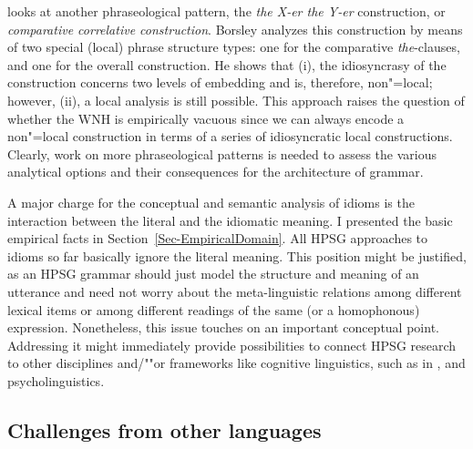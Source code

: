 \documentclass[output=paper
	        ,collection
	        ,collectionchapter
 	        ,biblatex
                ,babelshorthands
                ,newtxmath
                ,draftmode
                ,colorlinks, citecolor=brown
]{langscibook}
\begin{document}
\citet{Borsley2004a} looks at another phraseological pattern, the \emph{the X-er the Y-er} construction, or \emph{comparative correlative construction}.
Borsley analyzes this construction by means of two special (local) phrase structure types: one for the comparative \emph{the}-clauses, and one for the overall construction. He shows that (i), the idiosyncrasy of the construction concerns two levels of embedding and is, therefore, non"=local; however, (ii),
a local analysis is still possible. This approach raises the question of whether the WNH is empirically vacuous since we can always encode a non"=local construction in terms of a series of idiosyncratic local constructions. 
Clearly, work on more phraseological patterns is needed to assess the various analytical options and their consequences for the architecture of grammar.


A major charge for the conceptual and semantic analysis of idioms is the interaction between the literal and the idiomatic meaning. 
I presented the basic empirical facts in Section~\ref{Sec-EmpiricalDomain}. 
All HPSG approaches to idioms so far basically ignore the literal meaning.
This position might be justified, as  an HPSG grammar should just model the structure and meaning of an utterance and need not worry about the meta-linguistic relations among different lexical items or among different readings of the same (or a homophonous) expression.
Nonetheless, this issue touches on an important conceptual point. 
Addressing it might immediately provide possibilities to connect HPSG research to other disciplines and/""or frameworks like cognitive linguistics, such as in \citet{Dobrovolskij:Piirainen:05}, and psycholinguistics.




\subsection{Challenges from other languages}
\label{Sec-OtherLanguages}
\end{document}
